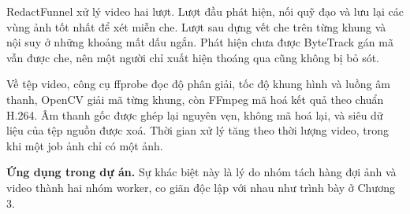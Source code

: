 RedactFunnel xử lý video hai lượt. Lượt đầu phát hiện, nối quỹ đạo và lưu lại các vùng ảnh tốt nhất để xét miễn che. Lượt sau dựng vết che trên từng khung và nội suy ở những khoảng mất dấu ngắn. Phát hiện chưa được ByteTrack gán mã vẫn được che, nên một người chỉ xuất hiện thoáng qua cũng không bị bỏ sót.

Về tệp video, công cụ ffprobe đọc độ phân giải, tốc độ khung hình và luồng âm thanh, OpenCV giải mã từng khung, còn FFmpeg mã hoá kết quả theo chuẩn H.264. Âm thanh gốc được ghép lại nguyên vẹn, không mã hoá lại, và siêu dữ liệu của tệp nguồn được xoá. Thời gian xử lý tăng theo thời lượng video, trong khi một job ảnh chỉ có một ảnh.

\textbf{Ứng dụng trong dự án.} Sự khác biệt này là lý do nhóm tách hàng đợi ảnh và video thành hai nhóm worker, co giãn độc lập với nhau như trình bày ở Chương 3.
